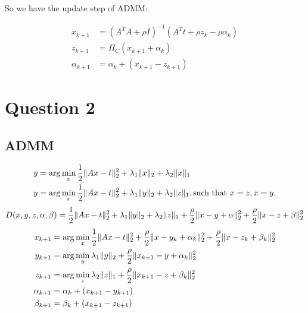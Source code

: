 \documentclass{amsart}
\DeclarePairedDelimiter\norm{\lVert}{\rVert}%
\begin{document}
So we have the update step of ADMM:
	
\begin{align*}
	x_{k+1} &= (A^TA + \rho I)^{-1}(A^Tt + \rho z_k - \rho \alpha_k)\\
	z_{k+1} &= \Pi_C(x_{k+1}+\alpha_k)\\
	\alpha_{k+1} &= \alpha_k + (x_{k+1} - z_{k+1})
\end{align*}

\section{Question 2}
\subsection{ADMM}
\begin{align*}
y &= \arg \min\limits_{x} \frac{1}{2} \norm{Ax-t}_2^2 + \lambda_1 \norm{x}_2 + \lambda_2 \norm{x}_1\\
y &= \arg \min\limits_{x} \frac{1}{2} \norm{Ax-t}_2^2 + \lambda_1 \norm{y}_2 + \lambda_2 \norm{z}_1, \text{such that } x=z, x=y.\\
\end{align*}
\begin{align*}
	D(x, y, z, \alpha, \beta) = \frac{1}{2} \norm{Ax-t}_2^2 + \lambda_1 \norm{y}_2 + \lambda_2 \norm{z}_1 + \frac{\rho}{2}\norm{x-y+\alpha}_2^2 + \frac{\rho}{2}\norm{x-z+\beta}_2^2
\end{align*}
\begin{align*}
	x_{k+1} &= \arg \min\limits_{x} \frac{1}{2} \norm{Ax-t}_2^2 + \frac{\rho}{2}\norm{x-y_{k}+\alpha_{k}}_2^2 + \frac{\rho}{2}\norm{x-z_{k}+\beta_{k}}_2^2\\
	y_{k+1} &= \arg \min\limits_{y} \lambda_1 \norm{y}_2 + \frac{\rho}{2}\norm{x_{k+1}-y+\alpha_k}_2^2\\
	z_{k+1} &= \arg \min\limits_{z} \lambda_2 \norm{z}_1 + \frac{\rho}{2}\norm{x_{k+1}-z+\beta_k}_2^2\\
	\alpha_{k+1} &= \alpha_k + (x_{k+1} - y_{k+1})\\
	\beta_{k+1} &= \beta_k + (x_{k+1} - z_{k+1})
\end{align*}
\end{document}
